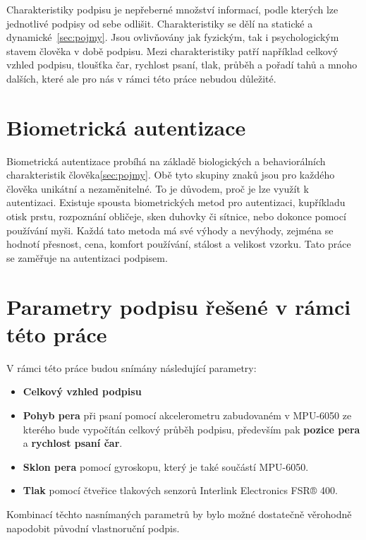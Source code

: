 Charakteristiky podpisu je nepřeberné množství informací, podle kterých lze jednotlivé podpisy od sebe odlišit. 
Charakteristiky se dělí na statické a dynamické~\ref{sec:pojmy}. 
Jsou ovlivňovány jak fyzickým, tak i psychologickým stavem člověka v době podpisu.
Mezi charakteristiky patří například celkový vzhled podpisu, tloušťka čar, rychlost psaní, tlak, průběh a pořadí tahů a mnoho dalších, které ale pro nás v rámci této práce nebudou důležité. %

\section{Biometrická autentizace}
Biometrická autentizace probíhá na základě biologických a behaviorálních charakteristik člověka\ref{sec:pojmy}. 
Obě tyto skupiny znaků jsou pro každého člověka unikátní a nezaměnitelné. To je důvodem, proč je lze využít k autentizaci.
Existuje spousta biometrických metod pro autentizaci, kupříkladu otisk prstu, rozpoznání obličeje, sken duhovky či sítnice, nebo dokonce pomocí používání myši. 
Každá tato metoda má své výhody a nevýhody, zejména se hodnotí přesnost, cena, komfort používání, stálost a velikost vzorku.
Tato práce se zaměřuje na autentizaci podpisem.

\section{Parametry podpisu řešené v rámci této práce}
V rámci této práce budou snímány následující parametry:
\begin{itemize}
  \item{\textbf{Celkový vzhled podpisu}}
  \item{\textbf{Pohyb pera} při psaní pomocí akcelerometru zabudovaném v MPU-6050 ze kterého bude vypočítán celkový průběh podpisu, především pak \textbf{pozice pera} a \textbf{rychlost psaní čar}.}
  \item{\textbf{Sklon pera} pomocí gyroskopu, který je také součástí MPU-6050.}
  \item{\textbf{Tlak} pomocí čtveřice tlakových senzorů Interlink Electronics FSR® 400.}
\end{itemize}
Kombinací těchto nasnímaných parametrů by bylo možné dostatečně věrohodně napodobit původní vlastnoruční podpis. 

